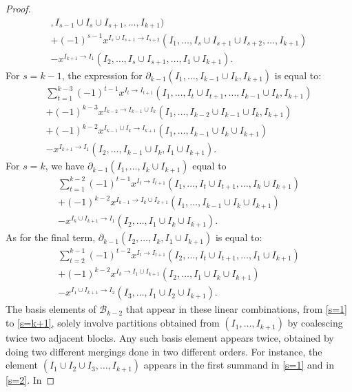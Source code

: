 \documentclass[10pt]{amsart}
\newcommand{\mcb}{\mbox{$\mathcal{B}$}}
\newcommand{\dif}{\mbox{$\partial$}}
\theoremstyle{definition}
\theoremstyle{remark}
\begin{document}
\begin{proof}
\begin{multline}
  ,I_{s-1}\cup I_{s}\cup I_{s+1},\ldots, I_{k+1})
  \\+(-1)^{s-1}x^{I_{s}\cup I_{s+1}\to I_{s+2}}(I_1,\ldots
  ,I_{s}\cup I_{s+1}\cup I_{s+2},\ldots, I_{k+1}) \\
  -x^{I_{k+1}\to I_{1}}(I_2,\ldots ,I_s\cup I_{s+1},\ldots ,I_1\cup
  I_{k+1}).
\end{multline}
For $s=k-1$, the expression for $\dif_{k-1}(I_1,\ldots ,I_{k-1}\cup
I_k,I_{k+1})$ is equal to:
\begin{multline}\label{s=k-1}
\sum_{t=1}^{k-3}(-1)^{t-1}x^{I_t\to I_{t+1}}(I_1,\ldots ,I_t\cup
  I_{t+1},\ldots , I_{k-1}\cup I_k,I_{k+1}) \\+
  (-1)^{k-3}x^{I_{k-2}\to I_{k-1}\cup I_k}(I_1,\ldots ,I_{k-2}\cup
  I_{k-1}\cup I_k,I_{k+1}) \\+
(-1)^{k-2}x^{I_{k-1}\cup I_{k}\to I_{k+1}}(I_1,\ldots , I_{k-1}\cup I_k\cup I_{k+1})  \\
 -x^{I_{k+1}\to I_{1}}(I_2,\ldots ,I_{k-1}\cup I_{k}, I_1\cup
  I_{k+1}).
\end{multline}
For $s=k$, we have $\dif_{k-1}(I_1,\ldots ,I_k\cup I_{k+1})$ equal to
\begin{multline}\label{s=k}
 \sum_{t=1}^{k-2}(-1)^{t-1}x^{I_t\to I_{t+1}}(I_1,\ldots ,I_t\cup
  I_{t+1},\ldots , I_k\cup I_{k+1}) \\ + (-1)^{k-2}x^{I_{k-1}\to
    I_{k}\cup I_{k+1}}(I_1,\ldots ,I_{k-1}\cup I_{k}\cup I_{k+1})
 \\- x^{I_{k}\cup I_{k+1}\to I_{1}}(I_2,\ldots ,I_1\cup
  I_k\cup I_{k+1}).
\end{multline}
As for the final term, $\dif_{k-1}(I_2,\ldots,I_{k},I_1\cup
I_{k+1})$ is equal to:
\begin{multline}\label{s=k+1}
\sum_{t=2}^{k-1}(-1)^{t-2}x^{I_t\to I_{t+1}}(I_2,\ldots ,I_t\cup
I_{t+1},\ldots ,I_1\cup I_{k+1})\\ 
+(-1)^{k-2}x^{I_{k}\to I_{1}\cup I_{k+1}}(I_2,\ldots ,I_{1}\cup 
I_{k}\cup I_{k+1})\\
- x^{I_{1}\cup
I_{k+1}\to I_{2}}(I_3,\ldots ,I_1\cup I_2\cup I_{k+1}).
\end{multline}
The basis elements of $\mcb_{k-2}$ that appear in these linear
combinations, from \eqref{s=1} to \eqref{s=k+1}, solely involve
partitions obtained from $(I_1,\ldots,I_{k+1})$ by coalescing twice
two adjacent blocks. Any such basis element appears twice, obtained by
doing two different mergings done in two different orders. For
instance, the element $(I_1\cup I_2\cup I_3,\ldots ,I_{k+1})$ appears
in the first summand in \eqref{s=1} and in \eqref{s=2}. In

\end{proof}
\end{document}
